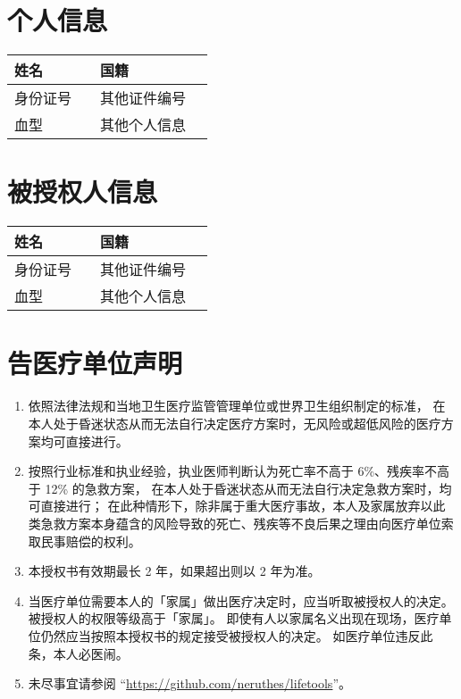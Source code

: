 \documentclass[a4paper,11pt]{article}
\begin{document}
\pagestyle{empty}
\tabulinesep=10pt


\rmfamily

\parindent=0pt





\section{个人信息}

\begin{tabu} {|X|X[2.5]|X|X[2.5]|}
	\hline
	{姓名}     & {} & {国籍}         & {} \\
	\hline
	{身份证号} & {} & {其他证件编号} & {} \\
	\hline
	{血型}     & {} & {其他个人信息} & {} \\
	\hline
\end{tabu}

\section{被授权人信息}

\begin{tabu} {|X|X[2.5]|X|X[2.5]|}
	\hline
	{姓名}     & {} & {国籍}         & {} \\
	\hline
	{身份证号} & {} & {其他证件编号} & {} \\
	\hline
	{血型}     & {} & {其他个人信息} & {} \\
	\hline
\end{tabu}

\normalsize

\section{告医疗单位声明}

\begin{enumerate}
	\item 依照法律法规和当地卫生医疗监管管理单位或世界卫生组织制定的标准，
	      在本人处于昏迷状态从而无法自行决定医疗方案时，无风险或超低风险的医疗方案均可直接进行。
	\item 按照行业标准和执业经验，执业医师判断认为死亡率不高于 6\%、残疾率不高于 12\% 的急救方案，
	      在本人处于昏迷状态从而无法自行决定急救方案时，均可直接进行；
	      在此种情形下，除非属于重大医疗事故，本人及家属放弃以此类急救方案本身蕴含的风险导致的死亡、残疾等不良后果之理由向医疗单位索取民事赔偿的权利。
	\item 本授权书有效期最长 2 年，如果超出则以 2 年为准。
	\item 当医疗单位需要本人的「家属」做出医疗决定时，应当听取被授权人的决定。被授权人的权限等级高于「家属」。
	      即使有人以家属名义出现在现场，医疗单位仍然应当按照本授权书的规定接受被授权人的决定。
	      如医疗单位违反此条，本人必医闹。
	\item 未尽事宜请参阅 ``\underline{https://github.com/neruthes/lifetools}''。
\end{enumerate}
\end{document}
